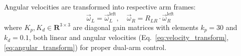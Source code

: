 \documentclass[pdflatex,sn-mathphys-num]{sn-jnl}%
\theoremstyle{thmstyleone}%
\theoremstyle{thmstylethree}%
\begin{document}
Angular velocities are transformed into respective arm frames:
\begin{equation}
\vec{\omega}_L = \vec{\omega}_L^{\text{left}}, \quad \vec{\omega}_R = R_{LR} \cdot \vec{\omega}_R^{\text{left}}
\label{eq:angular_transform}
\end{equation}
where $K_p, K_d \in \mathbf{R}^{3 \times 3}$ are diagonal gain matrices with elements $k_p = 30$ and $k_d = 0.1$, both linear and angular velocities (Eq.~\ref{eq:velocity_transform}, \ref{eq:angular_transform}) for proper dual-arm control.
        
        
        
\end{document}
